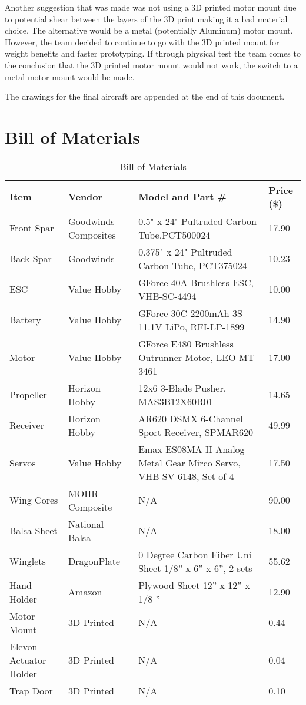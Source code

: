     Another suggestion that was made was not using a 3D printed motor mount due to potential shear between the layers of the 3D print making it a bad material choice. The alternative would be a metal (potentially Aluminum) motor mount. However, the team decided to continue to go with the 3D printed mount for weight benefits and faster prototyping. If through physical test the team comes to the conclusion that the 3D printed motor mount would not work, the switch to a metal motor mount would be made.
    
    The drawings for the final aircraft are appended at the end of this document.

\section{Bill of Materials}

    \begin{table}[H]
    \centering
    \caption{Bill of Materials} \label{tab:bom}
    \begin{tabular}{|p{1.25in}|p{1.25in}|p{2.75in}|p{.75in}|}
    \hline
    \textbf{Item} & \textbf{Vendor} & \textbf{Model and Part \#} & \textbf{Price (\$)} \\
    \hline
    Front Spar & Goodwinds Composites & 0.5" x 24" Pultruded Carbon Tube,PCT500024 & 17.90   \\ \hline
    Back Spar     & Goodwinds& 0.375" x 24" Pultruded Carbon Tube, PCT375024 & 10.23   \\ \hline
    ESC           & Value Hobby & GForce 40A Brushless ESC, VHB-SC-4494 & 10.00 \\ \hline
    Battery       & Value Hobby & GForce 30C 2200mAh 3S 11.1V LiPo, RFI-LP-1899 & 14.90 \\ \hline
    Motor         & Value Hobby & GForce E480 Brushless Outrunner Motor, LEO-MT-3461 & 17.00   \\ \hline
    Propeller     & Horizon Hobby   & 12x6 3-Blade Pusher, MAS3B12X60R01 & 14.65 \\ \hline
    Receiver      & Horizon Hobby   & AR620 DSMX 6-Channel Sport Receiver, SPMAR620 & 49.99 \\ \hline
    Servos        & Value Hobby & Emax ES08MA II Analog Metal Gear Mirco Servo, VHB-SV-6148, Set of 4 & 17.50 \\ \hline
    Wing Cores & MOHR Composite & N/A & 90.00 \\ \hline
    Balsa Sheet & National Balsa & N/A & 18.00 \\ \hline
    Winglets & DragonPlate & 0 Degree Carbon Fiber Uni Sheet 1/8'' x 6'' x 6'', 2 sets & 55.62 \\ \hline
    Hand Holder & Amazon & Plywood Sheet 12'' x 12'' x 1/8 '' & 12.90 \\ \hline
    Motor Mount & 3D Printed & N/A & 0.44 \\ \hline
    Elevon Actuator Holder & 3D Printed  & N/A & 0.04 \\ \hline
    Trap Door     & 3D Printed  & N/A & 0.10    \\ \hline
    \end{tabular}
    \end{table}
    
